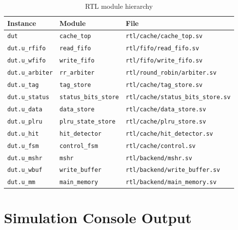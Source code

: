 \documentclass[12pt,letterpaper]{report}
\begin{document}
\begin{table}[h]
\centering
\caption{RTL module hierarchy}
\begin{tabular}{@{}lll@{}}
\toprule
Instance & Module & File \\
\midrule
\texttt{dut}           & \texttt{cache\_top}          & \texttt{rtl/cache/cache\_top.sv} \\
\texttt{dut.u\_rfifo}  & \texttt{read\_fifo}          & \texttt{rtl/fifo/read\_fifo.sv} \\
\texttt{dut.u\_wfifo}  & \texttt{write\_fifo}         & \texttt{rtl/fifo/write\_fifo.sv} \\
\texttt{dut.u\_arbiter}& \texttt{rr\_arbiter}         & \texttt{rtl/round\_robin/arbiter.sv} \\
\texttt{dut.u\_tag}    & \texttt{tag\_store}          & \texttt{rtl/cache/tag\_store.sv} \\
\texttt{dut.u\_status} & \texttt{status\_bits\_store} & \texttt{rtl/cache/status\_bits\_store.sv} \\
\texttt{dut.u\_data}   & \texttt{data\_store}         & \texttt{rtl/cache/data\_store.sv} \\
\texttt{dut.u\_plru}   & \texttt{plru\_state\_store}  & \texttt{rtl/cache/plru\_store.sv} \\
\texttt{dut.u\_hit}    & \texttt{hit\_detector}       & \texttt{rtl/cache/hit\_detector.sv} \\
\texttt{dut.u\_fsm}    & \texttt{control\_fsm}        & \texttt{rtl/cache/control.sv} \\
\texttt{dut.u\_mshr}   & \texttt{mshr}                & \texttt{rtl/backend/mshr.sv} \\
\texttt{dut.u\_wbuf}   & \texttt{write\_buffer}       & \texttt{rtl/backend/write\_buffer.sv} \\
\texttt{dut.u\_mm}     & \texttt{main\_memory}        & \texttt{rtl/backend/main\_memory.sv} \\
\bottomrule
\end{tabular}
\end{table}

\chapter{Simulation Console Output}
\label{app:sim}
\end{document}
